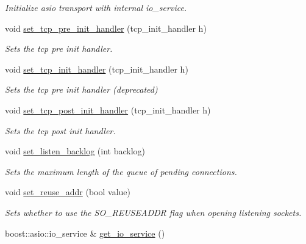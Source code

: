 \begin{DoxyCompactItemize}
\begin{DoxyCompactList}\small\item\em Initialize asio transport with internal io\+\_\+service. \end{DoxyCompactList}\item 
void \hyperlink{classwebsocketpp_1_1transport_1_1asio_1_1endpoint_ad334b214cf4800bb34aa09d7055e6464}{set\+\_\+tcp\+\_\+pre\+\_\+init\+\_\+handler} (tcp\+\_\+init\+\_\+handler h)
\begin{DoxyCompactList}\small\item\em Sets the tcp pre init handler. \end{DoxyCompactList}\item 
void \hyperlink{classwebsocketpp_1_1transport_1_1asio_1_1endpoint_a497f353a5ec277355cd8b0caf893d1ce}{set\+\_\+tcp\+\_\+init\+\_\+handler} (tcp\+\_\+init\+\_\+handler h)
\begin{DoxyCompactList}\small\item\em Sets the tcp pre init handler (deprecated) \end{DoxyCompactList}\item 
void \hyperlink{classwebsocketpp_1_1transport_1_1asio_1_1endpoint_a605c9f8c671d783739c1e98c6c7fda9d}{set\+\_\+tcp\+\_\+post\+\_\+init\+\_\+handler} (tcp\+\_\+init\+\_\+handler h)
\begin{DoxyCompactList}\small\item\em Sets the tcp post init handler. \end{DoxyCompactList}\item 
void \hyperlink{classwebsocketpp_1_1transport_1_1asio_1_1endpoint_a60bb0d01c277b7cfcb6f69215a36b216}{set\+\_\+listen\+\_\+backlog} (int backlog)
\begin{DoxyCompactList}\small\item\em Sets the maximum length of the queue of pending connections. \end{DoxyCompactList}\item 
void \hyperlink{classwebsocketpp_1_1transport_1_1asio_1_1endpoint_a491d13d6e1ad0edc5843e41b06fa4e0c}{set\+\_\+reuse\+\_\+addr} (bool value)
\begin{DoxyCompactList}\small\item\em Sets whether to use the S\+O\+\_\+\+R\+E\+U\+S\+E\+A\+D\+DR flag when opening listening sockets. \end{DoxyCompactList}\item 
boost\+::asio\+::io\+\_\+service \& \hyperlink{classwebsocketpp_1_1transport_1_1asio_1_1endpoint_a76c72b15412451ca6a122ed89fa0c7e6}{get\+\_\+io\+\_\+service} ()

\end{DoxyCompactItemize}
